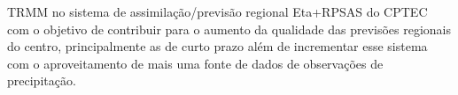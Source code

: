 \begin{resumo}
TRMM no sistema de assimilação/previsão regional Eta+RPSAS do CPTEC com o objetivo de contribuir para o aumento da qualidade das previsões regionais do centro, principalmente as de curto prazo além de incrementar esse sistema com o aproveitamento de mais uma fonte de dados de observações de precipitação.

\end{resumo}
